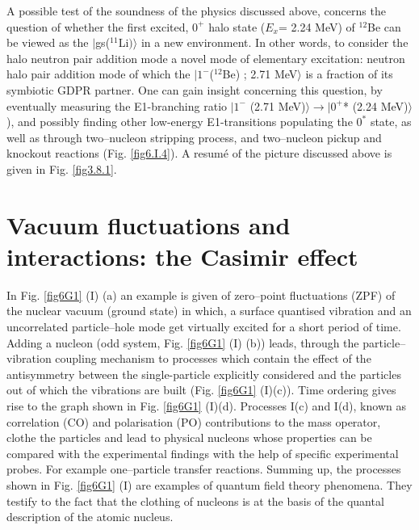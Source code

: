 \begin{subappendices}
A  possible test of the soundness of the physics  discussed above, concerns the question of whether the first excited, 
$0^+$ halo state ($E_x$= 2.24 MeV) of $^{12}$Be can be viewed as the $|$gs($^{11}$Li$)\rangle$ in a new environment. In other words, 
to consider the halo neutron pair addition mode
 a novel mode of  elementary excitation: neutron halo pair  addition mode of which the $|1^- $($^{12}$Be) ; 2.71 MeV$\rangle $ is 
 a fraction of  its symbiotic  GDPR partner. One can gain insight concerning this question, by 
 eventually measuring the E1-branching ratio $|1^-$ (2.71 MeV)$\rangle  \to |0^+$* (2.24 MeV)$\rangle$ ), and possibly 
 finding other low-energy E1-transitions populating the $0^*$ state, as well as through  two--nucleon stripping process,
 and two--nucleon pickup and knockout reactions (Fig. \ref{fig6.I.4}).
 A resum\'e of the picture discussed above is given   in Fig. \ref{fig3.8.1}. 
 \section[Vacuum fluctuations: the Casimir effect]{Vacuum fluctuations and interactions: the Casimir effect}
In Fig. \ref{fig6G1} (I) (a) an example is given of  zero--point fluctuations (ZPF) of the nuclear vacuum (ground state) in which, a surface quantised vibration and an uncorrelated particle--hole mode get virtually excited for a short period of time.  Adding 
a nucleon (odd system, Fig. \ref{fig6G1} (I) (b)) leads, through the particle--vibration coupling mechanism to processes which contain the effect of the antisymmetry between the single-particle explicitly considered and the particles out of which  the vibrations are built  (Fig. \ref{fig6G1} (I)(c)). Time ordering 
gives rise to the graph shown in Fig. \ref{fig6G1} (I)(d). Processes I(c) and I(d),  known as correlation (CO) and polarisation (PO) contributions to the mass
operator,  clothe the particles and lead to physical nucleons  whose properties can be compared with the experimental findings with the help of specific experimental probes. For example one--particle transfer reactions. Summing up, 
the processes shown in Fig. \ref{fig6G1} (I) are examples of quantum field theory phenomena. They testify  to the fact that the clothing of nucleons is at the basis of the quantal description of the atomic nucleus. 


\end{subappendices}
